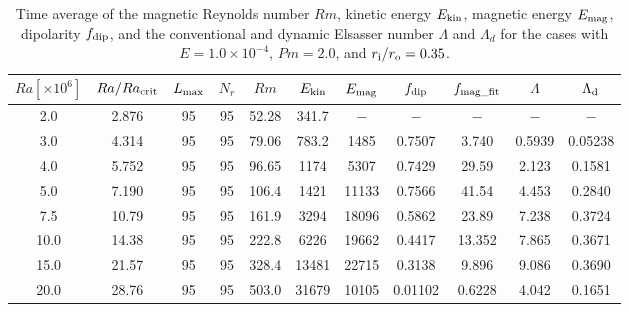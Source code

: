 \begin{table}
{\color{red}
\caption{Time average of the magnetic Reynolds number $Rm$, kinetic energy $E_{\rm kin}$, magnetic energy $E_{\rm mag}$, dipolarity $f_{\rm dip}$, and  the conventional and dynamic Elsasser number $\Lambda$ and $\Lambda_{d}$ for the cases with $E = 1.0 \times 10^{-4}$, $Pm = 2.0$, and $r_{\rm i}/r_{\rm o} = 0.35$.}
}
{\color{red}
  \begin{tabular}{ccccccccccc}
    \hline
     $Ra[\times 10^6]$  &  $Ra/Ra_{\rm crit}$& 
     $L_{\rm max}$ & $N_{r}$ & $Rm$ 
     & $E_{\rm kin}$  &  $E_{\rm mag}$ & $f_{\rm dip}$ & $f_{\rm mag\_fit}$ & $\Lambda$ & $\Lambda_{\rm d}$\\
    \hline
      2.0 & 2.876 & 95 & 95 & 52.28 & 341.7 & $-$ & $-$ & $-$ & $-$ & $-$ \\
      3.0 & 4.314 & 95 & 95 & 79.06 & 783.2 & 1485 & 0.7507 & 3.740 & 0.5939 & 0.05238 \\
      4.0 & 5.752 & 95 & 95 & 96.65 & 1174 & 5307 & 0.7429 & 29.59 & 2.123 & 0.1581 \\
      5.0 & 7.190 & 95 & 95 & 106.4 & 1421 & 11133 & 0.7566 & 41.54 & 4.453 & 0.2840 \\
      7.5 & 10.79 & 95 & 95 & 161.9 & 3294 & 18096 & 0.5862 & 23.89 & 7.238 & 0.3724 \\
      10.0 & 14.38 & 95 & 95 & 222.8 & 6226 & 19662 & 0.4417 & 13.352 & 7.865 & 0.3671 \\
      15.0 & 21.57 & 95 & 95 & 328.4 & 13481 & 22715 & 0.3138 & 9.896 & 9.086 & 0.3690  \\
      20.0 & 28.76 & 95 & 95 & 503.0 & 31679 & 10105 & 0.01102 & 0.6228 & 4.042 & 0.1651 \\
    \hline
  \end{tabular}
 }
\label{table:SummaryEk4_35}
\end{table}
%
%
%
%

%
%
%
%

